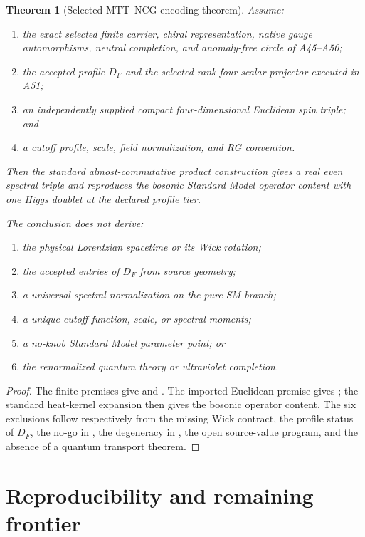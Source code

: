 \documentclass[11pt,a4paper,twoside]{article}
\theoremstyle{plain}
\newtheorem{theorem}{Theorem}[section]
\theoremstyle{definition}
\theoremstyle{remark}
\newcommand{\DF}{D_{F}}
\begin{document}
\begin{theorem}[Selected MTT--NCG encoding theorem]
\label{thm:synthesis}
Assume:
\begin{enumerate}
\item the exact selected finite carrier, chiral representation, native gauge
      automorphisms, neutral completion, and anomaly-free circle of A45--A50;
\item the accepted profile $\DF$ and the selected rank-four scalar projector
      executed in A51;
\item an independently supplied compact four-dimensional Euclidean spin
      triple; and
\item a cutoff profile, scale, field normalization, and RG convention.
\end{enumerate}
Then the standard almost-commutative product construction gives a real even
spectral triple and reproduces the bosonic Standard Model operator content
with one Higgs doublet at the declared profile tier.

The conclusion does not derive:
\begin{enumerate}
\item the physical Lorentzian spacetime or its Wick rotation;
\item the accepted entries of $\DF$ from source geometry;
\item a universal spectral normalization on the pure-SM branch;
\item a unique cutoff function, scale, or spectral moments;
\item a no-knob Standard Model parameter point; or
\item the renormalized quantum theory or ultraviolet completion.
\end{enumerate}
\end{theorem}

\begin{proof}
The finite premises give  and
.  The imported Euclidean premise gives
; the standard heat-kernel expansion then gives the
bosonic operator content.  The six exclusions follow respectively from the
missing Wick contract, the profile status of $\DF$, the no-go in
, the degeneracy in , the open
source-value program, and the absence of a quantum transport theorem.
\end{proof}

\section{Reproducibility and remaining frontier}
\end{document}

